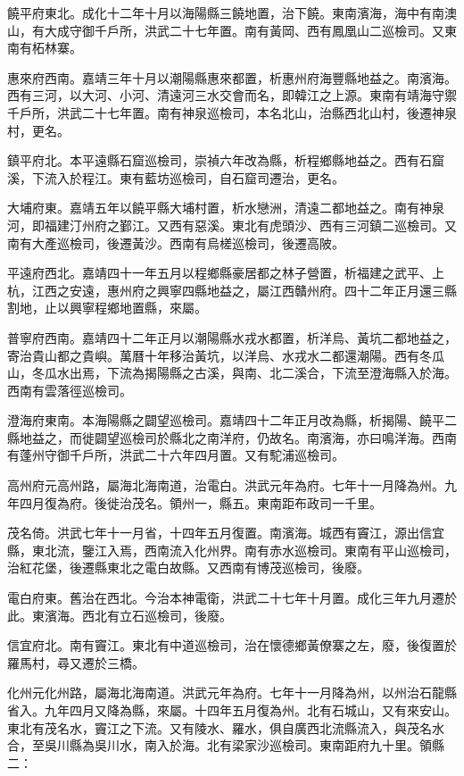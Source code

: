 饒平府東北。成化十二年十月以海陽縣三饒地置，治下饒。東南濱海，海中有南澳山，有大成守御千戶所，洪武二十七年置。南有黃岡、西有鳳凰山二巡檢司。又東南有柘林寨。

惠來府西南。嘉靖三年十月以潮陽縣惠來都置，析惠州府海豐縣地益之。南濱海。西有三河，以大河、小河、清遠河三水交會而名，即韓江之上源。東南有靖海守禦千戶所，洪武二十七年置。南有神泉巡檢司，本名北山，治縣西北山村，後遷神泉村，更名。

鎮平府北。本平遠縣石窟巡檢司，崇禎六年改為縣，析程鄉縣地益之。西有石窟溪，下流入於程江。東有藍坊巡檢司，自石窟司遷治，更名。

大埔府東。嘉靖五年以饒平縣大埔村置，析水戀洲，清遠二都地益之。南有神泉河，即福建汀州府之鄞江。又西有惡溪。東北有虎頭沙、西有三河鎮二巡檢司。又南有大產巡檢司，後遷黃沙。西南有烏槎巡檢司，後遷高陂。

平遠府西北。嘉靖四十一年五月以程鄉縣豪居都之林子營置，析福建之武平、上杭，江西之安遠，惠州府之興寧四縣地益之，屬江西贛州府。四十二年正月還三縣割地，止以興寧程鄉地置縣，來屬。

普寧府西南。嘉靖四十二年正月以潮陽縣水戎水都置，析洋烏、黃坑二都地益之，寄治貴山都之貴嶼。萬曆十年移治黃坑，以洋烏、水戎水二都還潮陽。西有冬瓜山，冬瓜水出焉，下流為揭陽縣之古溪，與南、北二溪合，下流至澄海縣入於海。西南有雲落徑巡檢司。

澄海府東南。本海陽縣之闢望巡檢司。嘉靖四十二年正月改為縣，析揭陽、饒平二縣地益之，而徙闢望巡檢司於縣北之南洋府，仍故名。南濱海，亦曰鳴洋海。西南有蓬州守御千戶所，洪武二十六年四月置。又有駝浦巡檢司。

高州府元高州路，屬海北海南道，治電白。洪武元年為府。七年十一月降為州。九年四月復為府。後徙治茂名。領州一，縣五。東南距布政司一千里。

茂名倚。洪武七年十一月省，十四年五月復置。南濱海。城西有竇江，源出信宜縣，東北流，鑒江入焉，西南流入化州界。南有赤水巡檢司。東南有平山巡檢司，治紅花堡，後遷縣東北之電白故縣。又西南有博茂巡檢司，後廢。

電白府東。舊治在西北。今治本神電衛，洪武二十七年十月置。成化三年九月遷於此。東濱海。西北有立石巡檢司，後廢。

信宜府北。南有竇江。東北有中道巡檢司，治在懷德鄉黃僚寨之左，廢，後復置於羅馬村，尋又遷於三橋。

化州元化州路，屬海北海南道。洪武元年為府。七年十一月降為州，以州治石龍縣省入。九年四月又降為縣，來屬。十四年五月復為州。北有石城山，又有來安山。東北有茂名水，竇江之下流。又有陵水、羅水，俱自廣西北流縣流入，與茂名水合，至吳川縣為吳川水，南入於海。北有梁家沙巡檢司。東南距府九十里。領縣二：

